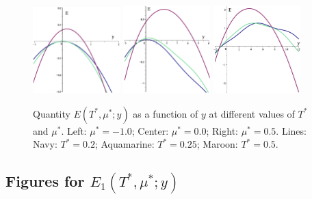 \documentclass[12pt]{article}
\numberwithin{equation}{section}
\begin{document}
	\begin{figure}[htbp]
		\includegraphics[width=0.3\textwidth,angle=0]{images/E0y_vs_y_b1}
		\hfill
		\includegraphics[width=0.3\textwidth,angle=0]{images/E0y_vs_y_b2}
		\hfill
		\includegraphics[width=0.3\textwidth,angle=0]{images/E0y_vs_y_b3}
		\vfill
		\parbox{0.95\textwidth}{\caption{\label{fig:E0y_vs_y_b} Quantity $E(T^*,\mu^*;y)$ as a function of $y$ at different values of $T^*$ and $\mu^*$. Left: $\mu^*=-1.0$; Center: $\mu^*=0.0$; Right: $\mu^*=0.5$. Lines: Navy: $T^*=0.2$; Aquamarine: $T^*=0.25$; Maroon: $T^*=0.5$.}}
		
	\end{figure}
	
	\pagebreak
	
	\subsection{Figures for $E_1(T^*,\mu^*;y)$}
	\label{sec:figE1}
	
\end{document}
